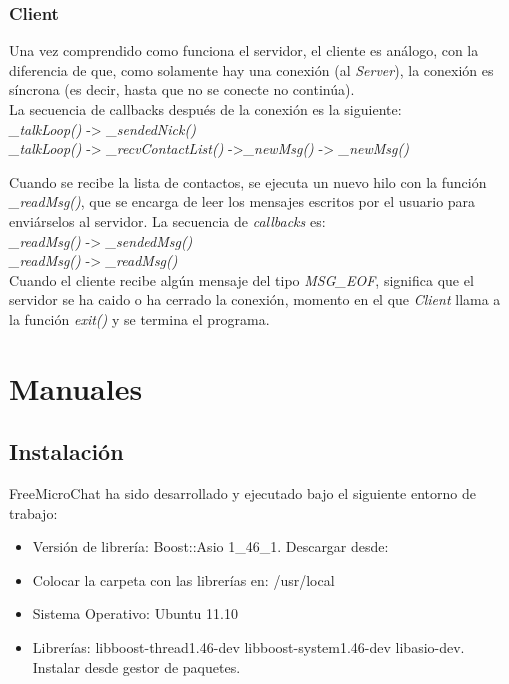 \documentclass[a4paper,11pt,titlepage,halfparskip,cleardoubleempty]{scrbook}
\begin{document}
   \subsection{Client}
   Una vez comprendido como funciona el servidor, el cliente es análogo, con la diferencia de que,
   como solamente hay una conexión (al \textit{Server}), la conexión es síncrona (es decir,
   hasta que no se conecte no continúa).\\

   La secuencia de callbacks después de la conexión es la siguiente:\\
     \textit{\_talkLoop()} -> \textit{\_sendedNick()}\\
     \textit{\_talkLoop()} -> \textit{\_recvContactList()} ->\textit{\_newMsg()} -> \textit{\_newMsg()}

   Cuando se recibe la lista de contactos, se ejecuta un nuevo hilo
   con la función \textit{\_readMsg()}, que se encarga de leer los mensajes escritos
   por el usuario para enviárselos al servidor. La secuencia de \textit{callbacks}
   es:\\
     \textit{\_readMsg()} -> \textit{\_sendedMsg()}\\
     \textit{\_readMsg()} -> \textit{\_readMsg()}\\

   Cuando el cliente recibe algún mensaje del tipo \textit{MSG\_EOF}, significa que el servidor se ha caido
   o ha cerrado la conexión, momento en el que \textit{Client} llama a la función \textit{exit()} y se termina
   el programa.

\chapter{Manuales}
\section{Instalación}

FreeMicroChat ha sido desarrollado y ejecutado bajo el siguiente entorno de trabajo:
\begin{itemize}
\item Versión de librería: Boost::Asio 1\_46\_1. Descargar desde: 
\item Colocar la carpeta con las librerías en: /usr/local
\item Sistema Operativo: Ubuntu 11.10
\item Librerías: libboost-thread1.46-dev libboost-system1.46-dev libasio-dev. Instalar desde gestor de paquetes.
\end{itemize}
\end{document}
